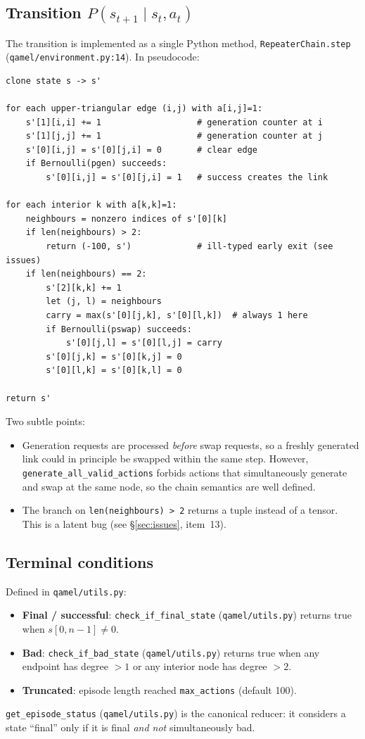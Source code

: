 \documentclass[11pt]{article}
\newcommand{\code}[1]{\texttt{#1}}
\newcommand{\file}[1]{\texttt{\small #1}}
\begin{document}
\subsection{Transition $P(s_{t+1}\mid s_t, a_t)$}
The transition is implemented as a single Python method, \code{RepeaterChain.step} (\file{qamel/environment.py:14}). In pseudocode:
\begin{verbatim}
clone state s -> s'

for each upper-triangular edge (i,j) with a[i,j]=1:
    s'[1][i,i] += 1                   # generation counter at i
    s'[1][j,j] += 1                   # generation counter at j
    s'[0][i,j] = s'[0][j,i] = 0       # clear edge
    if Bernoulli(pgen) succeeds:
        s'[0][i,j] = s'[0][j,i] = 1   # success creates the link

for each interior k with a[k,k]=1:
    neighbours = nonzero indices of s'[0][k]
    if len(neighbours) > 2:
        return (-100, s')             # ill-typed early exit (see issues)
    if len(neighbours) == 2:
        s'[2][k,k] += 1
        let (j, l) = neighbours
        carry = max(s'[0][j,k], s'[0][l,k])  # always 1 here
        if Bernoulli(pswap) succeeds:
            s'[0][j,l] = s'[0][l,j] = carry
        s'[0][j,k] = s'[0][k,j] = 0
        s'[0][l,k] = s'[0][k,l] = 0

return s'
\end{verbatim}
Two subtle points:
\begin{itemize}
  \item Generation requests are processed \emph{before} swap requests, so a freshly generated link could in principle be swapped within the same step. However, \code{generate\_all\_valid\_actions} forbids actions that simultaneously generate and swap at the same node, so the chain semantics are well defined.
  \item The branch on \code{len(neighbours) > 2} returns a tuple instead of a tensor. This is a latent bug (see \S\ref{sec:issues}, item~13).
\end{itemize}

\subsection{Terminal conditions}
Defined in \file{qamel/utils.py}:
\begin{itemize}
  \item \textbf{Final / successful}: \code{check\_if\_final\_state} (\file{qamel/utils.py}) returns true when $s[0,n-1] \ne 0$.
  \item \textbf{Bad}: \code{check\_if\_bad\_state} (\file{qamel/utils.py}) returns true when any endpoint has degree $> 1$ or any interior node has degree $> 2$.
  \item \textbf{Truncated}: episode length reached \code{max\_actions} (default 100).
\end{itemize}
\code{get\_episode\_status} (\file{qamel/utils.py}) is the canonical reducer: it considers a state ``final'' only if it is final \emph{and not} simultaneously bad.
\end{document}
